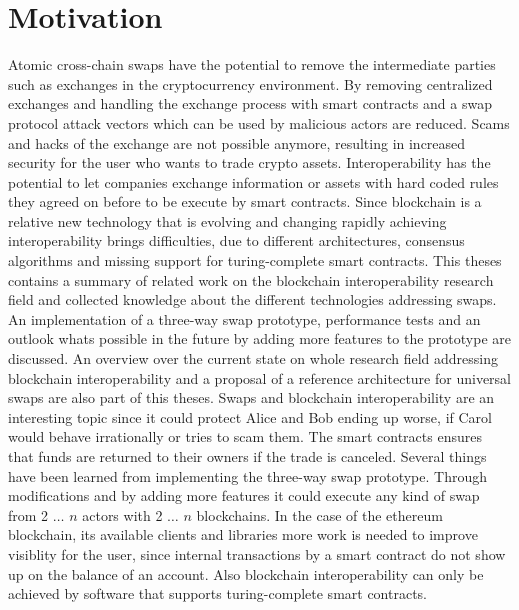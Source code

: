 \section{Motivation}
\label{sec:intro:motivation}
Atomic cross-chain swaps have the potential to remove the intermediate parties such as exchanges in the cryptocurrency environment. By removing centralized exchanges and handling the exchange process with smart contracts and a swap protocol attack vectors which can be used by malicious actors are reduced. Scams and hacks of the exchange are not possible anymore, resulting in increased security for the user who wants to trade crypto assets. Interoperability has the potential to let companies exchange information or assets with hard coded rules they agreed on before to be execute by smart contracts. Since blockchain is a relative new technology that is evolving and changing rapidly achieving interoperability brings difficulties, due to different architectures, consensus algorithms and missing support for turing-complete smart contracts. This theses contains a summary of related work on the blockchain interoperability research field and collected knowledge about the different technologies addressing swaps. An implementation of a three-way swap prototype, performance tests and an outlook whats possible in the future by adding more features to the prototype are discussed. An overview over the current state on whole research field addressing blockchain interoperability and a proposal of a reference architecture for universal swaps are also part of this theses. Swaps and blockchain interoperability are an interesting topic since it could protect Alice and Bob ending up worse, if Carol would behave irrationally or tries to scam them. The smart contracts ensures that funds are returned to their owners if the trade is canceled. Several things have been learned from implementing the three-way swap prototype. Through modifications and by adding more features it could execute any kind of swap from 2 $\dots$ $n$ actors with 2 $\dots$ $n$ blockchains. In the case of the ethereum blockchain, its available clients and libraries more work is needed to improve visiblity for the user, since internal transactions by a smart contract do not show up on the balance of an account. Also blockchain interoperability can only be achieved by software that supports turing-complete smart contracts.

%
%
